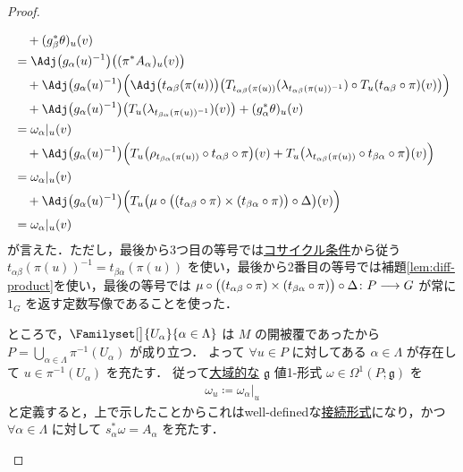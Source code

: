 \documentclass[TQFT_main]{subfiles}
\begin{document}
\begin{proof}
\begin{enumerate}
\begin{description}
\begin{align}
                &\quad + (g_\beta^* \theta)_u(v) \\
                &= \Adj \bigl( g_\alpha(u)^{-1} \bigr) \bigl( (\pi^* A_\alpha)_u (v) \bigr) \\
                &\quad + \Adj \bigl(g_\alpha(u)^{-1}\bigr) \Bigl( \Adj \bigl( t_{\alpha\beta}(\pi(u)) \bigr)\bigl( T_{t_{\alpha\beta}(\pi(u))} (\lambda_{t_{\alpha\beta}(\pi(u))^{-1}}) \circ T_u (t_{\alpha\beta}\circ \pi) (v) \bigr) \Bigr) \\
                &\quad + \Adj \bigl(g_\alpha(u)^{-1}\bigr) \bigl( T_u(\lambda_{t_{\beta\alpha}(\pi(u))^{-1}})(v) \bigr) + (g_\alpha^* \theta)_u (v) \\
                &= \omega_\alpha|_u (v) \\
                &\quad + \Adj \bigl(g_\alpha(u)^{-1}\bigr) \Bigl( T_u \bigl( \rho_{t_{\beta\alpha}(\pi(u))} \circ t_{\alpha\beta} \circ \pi \bigr)(v) + T_u \bigl( \lambda_{t_{\alpha\beta}(\pi(u))} \circ t_{\beta\alpha} \circ \pi \bigr)(v)  \Bigr) \\
                &= \omega_\alpha|_u(v) \\
                &\quad + \Adj \bigl(g_\alpha(u)^{-1}\bigr) \Bigl( T_u \bigl( \mu \circ \bigl( (t_{\alpha\beta} \circ \pi) \times (t_{\beta\alpha} \circ \pi) \bigr) \circ \Delta \bigr)(v) \Bigr) \\
                &= \omega_\alpha|_u(v)
            \end{align}
            が言えた．ただし，最後から3つ目の等号では\hyperref[eq.cocycle]{コサイクル条件}から従う $t_{\alpha\beta}(\pi(u))^{-1} = t_{\beta\alpha}(\pi(u))$ を使い，最後から2番目の等号では補題\ref{lem:diff-product}を使い，最後の等号では $\mu \circ \bigl( (t_{\alpha\beta} \circ \pi) \times (t_{\beta\alpha} \circ \pi) \bigr) \circ \Delta \colon P \longrightarrow G$ が常に $1_G$ を返す定数写像であることを使った．
            
        \end{description}
        ところで，$\Familyset[\big]{U_\alpha}{\alpha \in \Lambda}$ は $M$ の開被覆であったから $P = \bigcup_{\alpha \in \Lambda} \pi^{-1}(U_\alpha)$ が成り立つ．
        よって $\forall u \in P$ に対してある $\alpha \in \Lambda$ が存在して $u \in \pi^{-1}(U_\alpha)$ を充たす．
        従って\underline{大域的な} $\mathfrak{g}$ 値1-形式 $\omega \in \Omega^1(P; \mathfrak{g})$ を
        \begin{align}
            \omega_u \coloneqq \omega_\alpha|_u
        \end{align}
        と定義すると，上で示したことからこれはwell-definedな\hyperref[def:connection]{接続形式}になり，かつ $\forall \alpha \in \Lambda$ に対して $s_\alpha^* \omega = A_\alpha$ を充たす．


\end{enumerate}
\end{proof}
\end{document}
